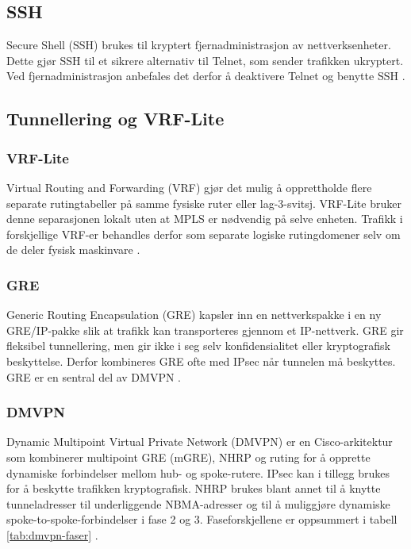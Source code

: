 \subsection{SSH}

Secure Shell (SSH) brukes til kryptert fjernadministrasjon av nettverksenheter. Dette gjør SSH til et sikrere alternativ til Telnet, som sender trafikken ukryptert. Ved fjernadministrasjon anbefales det derfor å deaktivere Telnet og benytte SSH \cite{forsvaret_nettverk_rolle1}.

\subsection{Tunnellering og VRF-Lite}

\subsubsection{VRF-Lite}

Virtual Routing and Forwarding (VRF) gjør det mulig å opprettholde flere separate rutingtabeller på samme fysiske ruter eller lag-3-svitsj. VRF-Lite bruker denne separasjonen lokalt uten at MPLS er nødvendig på selve enheten. Trafikk i forskjellige VRF-er behandles derfor som separate logiske rutingdomener selv om de deler fysisk maskinvare \cite{forsvaret_nettverk_rolle1}.

\subsubsection{GRE}

Generic Routing Encapsulation (GRE) kapsler inn en nettverkspakke i en ny GRE/IP-pakke slik at trafikk kan transporteres gjennom et IP-nettverk. GRE gir fleksibel tunnellering, men gir ikke i seg selv konfidensialitet eller kryptografisk beskyttelse. Derfor kombineres GRE ofte med IPsec når tunnelen må beskyttes. GRE er en sentral del av DMVPN \cite{rfc2784,cisco_dmvpn_current}.

\subsubsection{DMVPN}

Dynamic Multipoint Virtual Private Network (DMVPN) er en Cisco-arkitektur som kombinerer multipoint GRE (mGRE), NHRP og ruting for å opprette dynamiske forbindelser mellom hub- og spoke-rutere. IPsec kan i tillegg brukes for å beskytte trafikken kryptografisk. NHRP brukes blant annet til å knytte tunneladresser til underliggende NBMA-adresser og til å muliggjøre dynamiske spoke-to-spoke-forbindelser i fase 2 og 3. Faseforskjellene er oppsummert i tabell \ref{tab:dmvpn-faser} \cite{cisco_dmvpn_current, dmvpn_phase_3}.

